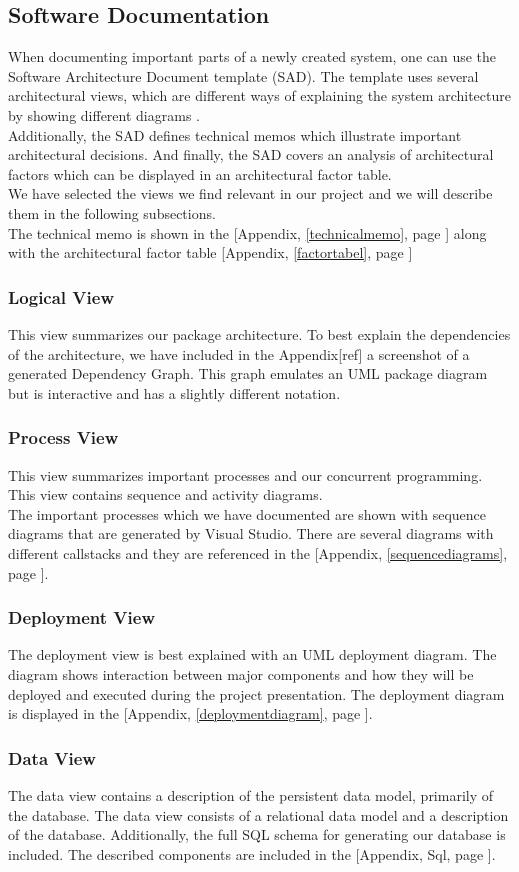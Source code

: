 \subsection{Software Documentation}
When documenting important parts of a newly created system, one can use the Software Architecture Document template (SAD). The template uses several architectural views, which are different ways of explaining the system architecture by showing different diagrams \cite[p.~656]{OOAD}.\\
Additionally, the SAD defines technical memos which illustrate important architectural decisions. And finally, the SAD covers an analysis of architectural factors which can be displayed in an architectural factor table.\\
We have selected the views we find relevant in our project and we will describe them in the following subsections.\\
The technical memo is shown in the [Appendix, \ref{technicalmemo}, page \pageref{technicalmemo}] along with the architectural factor table [Appendix, \ref{factortabel}, page \pageref{factortabel}]
\subsubsection{Logical View} 
This view summarizes our package architecture. To best explain the dependencies of the architecture, we have included in the Appendix[ref] a screenshot of a generated Dependency Graph. This graph emulates an UML package diagram but is interactive and has a slightly different notation.\\
\subsubsection{Process View}
This view summarizes important processes and our concurrent programming. This view contains sequence and activity diagrams.\\
The important processes which we have documented are shown with sequence diagrams that are generated by Visual Studio. There are several diagrams
with different callstacks and they are referenced in the [Appendix, \ref{sequencediagrams}, page \pageref{sequencediagrams}]. 
\subsubsection{Deployment View}
The deployment view is best explained with an UML deployment diagram. The diagram shows interaction between major components and how they
will be deployed and executed during the project presentation. The deployment diagram is displayed in the [Appendix, \ref{deploymentdiagram}, page \pageref{deploymentdiagram}].
\subsubsection{Data View}
The data view contains a description of the persistent data model, primarily of the database. The data view consists of a relational data model
and a description of the database. Additionally, the full SQL schema for generating our database is included. The described components are included in the [Appendix, Sql, page \pageref{sql}].
